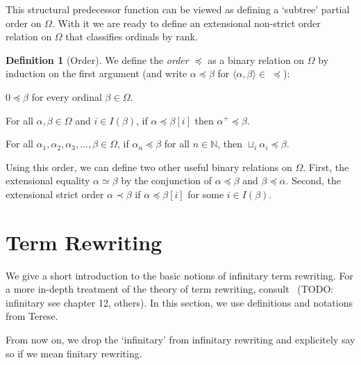 \documentclass[11pt,oneside,a4paper,final]{report}
\theoremstyle{definition}
\newtheorem{definition}{Definition}
\begin{document}

This structural predecessor function can be viewed as defining a `subtree'
partial order on $\Omega$. With it we are ready to define an extensional
non-strict order relation on $\Omega$ that classifies ordinals by rank.

\begin{definition}[Order]
We define the \emph{order} $\preceq$ as a binary relation on $\Omega$ by
induction on the first argument (and write $\alpha \preceq \beta$ for $\langle
\alpha, \beta \rangle \in \; \preceq$):
\begin{compactenum}
  \item
    $0 \preceq \beta$ for every ordinal $\beta \in \Omega$.
  \item
    For all $\alpha, \beta \in \Omega$ and $i \in I(\beta)$, if $\alpha
    \preceq \beta[i]$ then $\alpha^+ \preceq \beta$.
  \item
    For all $\alpha_1, \alpha_2, \alpha_3, \ldots, \beta \in \Omega$, if
    $\alpha_n \preceq \beta$ for all $n \in \mathbb{N}$, then $\sqcup_i
    \alpha_i \preceq \beta$.
\end{compactenum}
\end{definition}

Using this order, we can define two other useful binary relations on
$\Omega$. First, the extensional equality $\alpha \simeq \beta$ by the
conjunction of $\alpha \preceq \beta$ and $\beta \preceq \alpha$. Second, the
extensional strict order $\alpha \prec \beta$ if $\alpha \preceq \beta[i]$ for
some $i \in I(\beta)$.


\section{Term Rewriting}\label{sec:trs}


We give a short introduction to the basic notions of infinitary term
rewriting. For a more in-depth treatment of the theory of term rewriting,
consult~\cite{terese-03} (TODO: infinitary see chapter 12, others). In this
section, we use definitions and notations from Terese.

From now on, we drop the `infinitary' from infinitary rewriting and
explicitely say so if we mean finitary rewriting.
\end{document}
